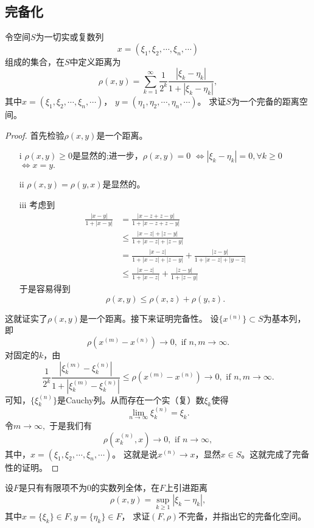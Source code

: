 \subsection{完备化}

\begin{exercise}
令空间$S$为一切实或复数列
$$x=(\xi_1,\xi_2,\cdots,\xi_n,\cdots)$$
组成的集合，在$S$中定义距离为
$$\rho(x,y)=\sum_{k=1}^{\infty}\frac{1}{2^k}\frac{|\xi_k-\eta_k|}{1+|\xi_k-\eta_k|},$$
其中$x=(\xi_1,\xi_2,\cdots,\xi_n,\cdots)$，
$y=(\eta_1,\eta_2,\cdots,\eta_n,\cdots)$。
求证$S$为一个完备的距离空间。
\end{exercise}

\begin{proof}
首先检验$\rho(x,y)$是一个距离。
\begin{enumerate}
\item[i] $\rho(x,y)\geq0$是显然的;进一步，$\rho(x,y)=0$ $\Longleftrightarrow|\xi_k-\eta_k|=0,\forall k\geq0$ $\Longleftrightarrow x=y.$
\item[ii] $\rho(x,y)=\rho(y,x)$是显然的。
\item[iii] 考虑到
\begin{align*}
\frac{|x-y|}{1+|x-y|}&=\frac{|x-z+z-y|}{1+|x-z+z-y|}\\
&\leq\frac{|x-z|+|z-y|}{1+|x-z|+|z-y|}\\
&=\frac{|x-z|}{1+|x-z|+|z-y|}+\frac{|z-y|}{1+|x-z|+|y-z|}\\
&\leq\frac{|x-z|}{1+|x-z|}+\frac{|z-y|}{1+|z-y|}
\end{align*}
于是容易得到
$$\rho(x,y)\leq\rho(x,z)+\rho(y,z).$$
\end{enumerate}
这就证实了$\rho(x,y)$是一个距离。接下来证明完备性。
设$\{x^{(n)}\}\subset S$为基本列，即
$$\rho(x^{(m)}-x^{(n)})\rightarrow0,\text{ if }n,m\rightarrow\infty.$$
对固定的$k$，由$$\frac{1}{2^k}\frac{|\xi^{(m)}_k-\xi^{(n)}_k|}{1+|\xi^{(m)}_k-\xi^{(n)}_k|}\leq\rho(x^{(m)}-x^{(n)})\rightarrow0,\text{ if }n,m\rightarrow\infty.$$
可知，$\{\xi_k^{(n)}\}$是Cauchy列。从而存在一个实（复）数$\xi_k$使得
$$\lim_{n\rightarrow\infty}\xi_k^{(n)}=\xi_k.$$
令$m\rightarrow\infty,$
于是我们有$$\rho(x_k^{(n)},x)\rightarrow0,\text{ if }n\rightarrow\infty,$$
其中，$x=(\xi_1,\xi_2,\cdots,\xi_n,\cdots)$。
这就是说$x^{(n)}\rightarrow x$，显然$x\in S$。这就完成了完备性的证明。
\end{proof}

\begin{exercise}
设$F$是只有有限项不为0的实数列全体，在$F$上引进距离
$$\rho(x,y)=\sup_{k\geq1}|\xi_k-\eta_k|,$$
其中$x=\{\xi_k\}\in F,y=\{\eta_k\}\in F$，
求证$(F,\rho)$不完备，并指出它的完备化空间。
\end{exercise}


